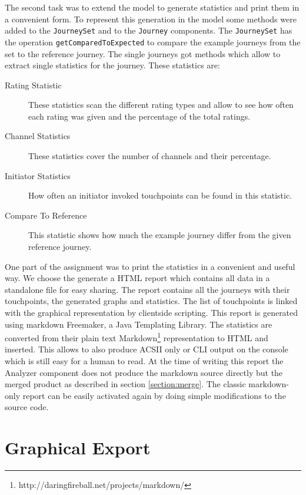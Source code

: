 \documentclass[12pt]{scrartcl}
\begin{document}
The second task was to extend the model to generate statistics and print them in a convenient form. To represent
this generation in the model some methods were added to the \lstinline!JourneySet! and to the \lstinline!Journey!
components. The \lstinline!JourneySet! has the operation \lstinline!getComparedToExpected! to compare the example 
journeys from the set to the reference journey. The single journeys got methods which allow to extract single
statistics for the journey. These statistics are:
\begin{description}
	\item[Rating Statistic] These statistics scan the different rating types and allow to see how often each rating
	was given and the percentage of the total ratings.
	\item[Channel Statistics] These statistics cover the number of channels and their percentage.
	\item[Initiator Statistics] How often an initiator invoked touchpoints can be found in this statistic.
	\item[Compare To Reference] This statistic shows how much the example journey differ from the given reference
	journey.
\end{description}

One part of the assignment was to print the statistics in a convenient and useful way.
We choose the generate a HTML report which contains all data in a standalone file for easy sharing. The report
contains all the journeys with their touchpoints, the generated graphs and statistics. The list of touchpoints
is linked with the graphical representation by clientside scripting. This report is generated using markdown
Freemaker, a Java Templating Library. The statistics are converted from their plain text Markdown\footnote{http://daringfireball.net/projects/markdown/} representation to HTML and inserted. This allows to also
produce ACSII only or CLI output on the console which is still easy for a human to read. At the time
of writing this report the Analyzer component does not  produce the markdown source directly but the merged product as 
described in  section \ref{section:merge}. The classic markdown-only report can be easily activated again by doing
simple modifications to the source code.

\section{Graphical Export} 
\label{section:export}
\end{document}
